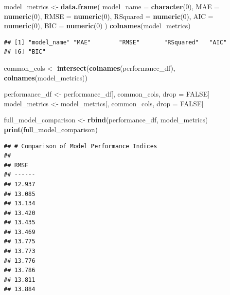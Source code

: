 \documentclass[
]{article}
\newenvironment{Shaded}{\begin{snugshade}}{\end{snugshade}}
\newcommand{\AttributeTok}[1]{\textcolor[rgb]{0.13,0.29,0.53}{#1}}
\newcommand{\ConstantTok}[1]{\textcolor[rgb]{0.56,0.35,0.01}{#1}}
\newcommand{\DecValTok}[1]{\textcolor[rgb]{0.00,0.00,0.81}{#1}}
\newcommand{\FunctionTok}[1]{\textcolor[rgb]{0.13,0.29,0.53}{\textbf{#1}}}
\newcommand{\NormalTok}[1]{#1}
\newcommand{\OtherTok}[1]{\textcolor[rgb]{0.56,0.35,0.01}{#1}}
\begin{document}
\begin{Shaded}
\begin{Highlighting}[]
\NormalTok{model\_metrics }\OtherTok{\textless{}{-}} \FunctionTok{data.frame}\NormalTok{(}
  \AttributeTok{model\_name =} \FunctionTok{character}\NormalTok{(}\DecValTok{0}\NormalTok{), }
  \AttributeTok{MAE =} \FunctionTok{numeric}\NormalTok{(}\DecValTok{0}\NormalTok{),     }
  \AttributeTok{RMSE =} \FunctionTok{numeric}\NormalTok{(}\DecValTok{0}\NormalTok{),    }
  \AttributeTok{RSquared =} \FunctionTok{numeric}\NormalTok{(}\DecValTok{0}\NormalTok{),}
  \AttributeTok{AIC =} \FunctionTok{numeric}\NormalTok{(}\DecValTok{0}\NormalTok{),}
  \AttributeTok{BIC =} \FunctionTok{numeric}\NormalTok{(}\DecValTok{0}\NormalTok{)       }
\NormalTok{)}
\FunctionTok{colnames}\NormalTok{(model\_metrics)}
\end{Highlighting}
\end{Shaded}

\begin{verbatim}
## [1] "model_name" "MAE"        "RMSE"       "RSquared"   "AIC"       
## [6] "BIC"
\end{verbatim}

\begin{Shaded}
\begin{Highlighting}[]
\NormalTok{common\_cols }\OtherTok{\textless{}{-}} \FunctionTok{intersect}\NormalTok{(}\FunctionTok{colnames}\NormalTok{(performance\_df), }\FunctionTok{colnames}\NormalTok{(model\_metrics))}

\NormalTok{performance\_df }\OtherTok{\textless{}{-}}\NormalTok{ performance\_df[, common\_cols, drop }\OtherTok{=} \ConstantTok{FALSE}\NormalTok{]}
\NormalTok{model\_metrics }\OtherTok{\textless{}{-}}\NormalTok{ model\_metrics[, common\_cols, drop }\OtherTok{=} \ConstantTok{FALSE}\NormalTok{]}

\NormalTok{full\_model\_comparison }\OtherTok{\textless{}{-}} \FunctionTok{rbind}\NormalTok{(performance\_df, model\_metrics)}
\FunctionTok{print}\NormalTok{(full\_model\_comparison)}
\end{Highlighting}
\end{Shaded}

\begin{verbatim}
## # Comparison of Model Performance Indices
## 
## RMSE  
## ------
## 12.937
## 13.085
## 13.134
## 13.420
## 13.435
## 13.469
## 13.775
## 13.773
## 13.776
## 13.786
## 13.811
## 13.884
\end{verbatim}
\end{document}
